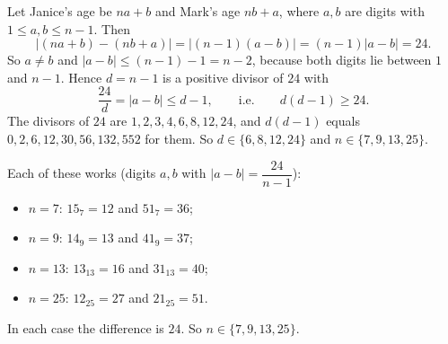 Let Janice's age be $na+b$ and Mark's age $nb+a$, where $a,b$ are digits with $1\le a,b\le n-1$. Then
\[|(na+b)-(nb+a)|=|(n-1)(a-b)|=(n-1)|a-b|=24.\]
So $a\ne b$ and $|a-b|\le(n-1)-1=n-2$, because both digits lie between $1$ and $n-1$. Hence $d=n-1$ is a positive divisor of $24$ with
\[\dfrac{24}{d}=|a-b|\le d-1,\qquad\text{i.e.}\qquad d(d-1)\ge24.\]
The divisors of $24$ are $1,2,3,4,6,8,12,24$, and $d(d-1)$ equals $0,2,6,12,30,56,132,552$ for them. So $d\in\{6,8,12,24\}$ and $n\in\{7,9,13,25\}$.

Each of these works (digits $a,b$ with $|a-b|=\dfrac{24}{n-1}$):
\begin{itemize}
\item $n=7$: $15_7=12$ and $51_7=36$;
\item $n=9$: $14_9=13$ and $41_9=37$;
\item $n=13$: $13_{13}=16$ and $31_{13}=40$;
\item $n=25$: $12_{25}=27$ and $21_{25}=51$.
\end{itemize}
In each case the difference is $24$. So $n\in\boxed{\{7,9,13,25\}}$.
